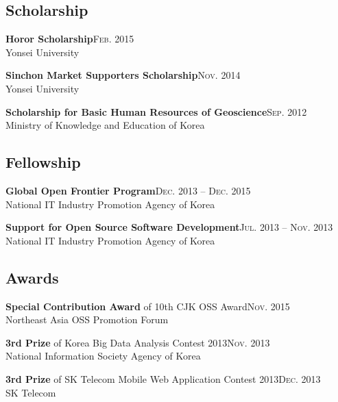 \documentclass[11pt,a4paper]{article}
\renewenvironment{itemize}{
  \begin{list}{}{
    \setlength{\leftmargin}{1.5em}
    \setlength{\itemsep}{0.5em}
    \setlength{\parskip}{0pt}
    \setlength{\parsep}{0.25em}
  }
}{
  \end{list}
}
\begin{document}
\subsection*{Scholarship}
\begin{itemize}
  \item \textbf{Horor Scholarship}\hfill\textsc{Feb. 2015}\\
        Yonsei University
  \item \textbf{Sinchon Market Supporters Scholarship}\hfill\textsc{Nov. 2014}\\
        Yonsei University
  \item \textbf{Scholarship for Basic Human Resources of Geoscience}\hfill\textsc{Sep. 2012}\\
        Ministry of Knowledge and Education of Korea
\end{itemize}
\subsection*{Fellowship}
\begin{itemize}
  \item \textbf{Global Open Frontier Program}\hfill\textsc{Dec. 2013 -- Dec. 2015}\\
        National IT Industry Promotion Agency of Korea
  \item \textbf{Support for Open Source Software Development}\hfill\textsc{Jul. 2013 -- Nov. 2013}\\
        National IT Industry Promotion Agency of Korea
\end{itemize}
\subsection*{Awards}
\begin{itemize}
  \item \textbf{Special Contribution Award} of 10th CJK OSS Award\hfill\textsc{Nov. 2015}\\
        Northeast Asia OSS Promotion Forum
  \item \textbf{3rd Prize} of Korea Big Data Analysis Contest 2013\hfill\textsc{Nov. 2013}\\
        National Information Society Agency of Korea
  \item \textbf{3rd Prize} of SK Telecom Mobile Web Application Contest 2013\hfill\textsc{Dec. 2013}\\
        SK Telecom
\end{itemize}
\end{document}
